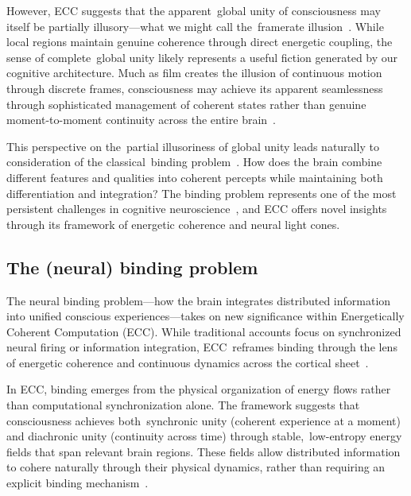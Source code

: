 However, ECC suggests that the apparent~global unity of consciousness may itself be partially illusory—what we might call the~framerate illusion~\cite{dehaene2011}. While local regions maintain genuine coherence through direct energetic coupling, the sense of complete~global unity likely represents a useful fiction generated by our cognitive architecture. Much as film creates the illusion of continuous motion through discrete frames, consciousness may achieve its apparent seamlessness through sophisticated management of coherent states rather than genuine moment-to-moment continuity across the entire brain~\cite{baars2013global}.

This perspective on the~partial illusoriness of global unity leads naturally to consideration of the classical~binding problem~\cite{brook2014unity}. How does the brain combine different features and qualities into coherent percepts while maintaining both differentiation and integration? The binding problem represents one of the most persistent challenges in cognitive neuroscience~\cite{gallagher2020phenomenological}, and ECC offers novel insights through its framework of energetic coherence and neural light cones.

\subsection*{The (neural) binding problem~}

The neural binding problem—how the brain integrates distributed information into unified conscious experiences—takes on new significance within Energetically Coherent Computation (ECC). While traditional accounts focus on synchronized neural firing or information integration, ECC~reframes binding through the lens of energetic coherence and continuous dynamics across the cortical sheet~\cite{pinotsis2023cytoelectric, pinotsis2023vivo}.

In ECC, binding emerges from the physical organization of energy flows rather than computational synchronization alone. The framework suggests that consciousness achieves both~synchronic unity (coherent experience at a moment) and diachronic unity (continuity across time) through stable,~low-entropy energy fields that span relevant brain regions. These fields allow distributed information to cohere naturally through their physical dynamics, rather than requiring an explicit binding mechanism~\cite{hunt2024electromagnetic}.


